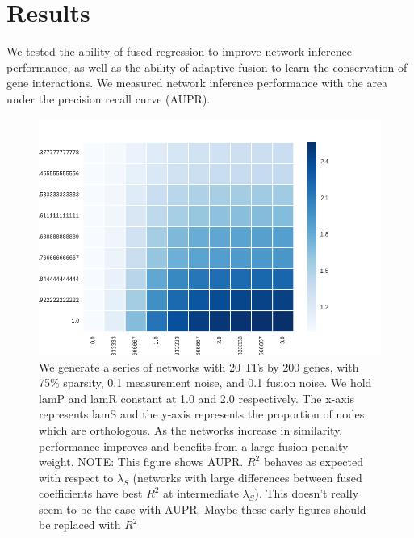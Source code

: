 \documentclass[11pt]{article}
\begin{document}
\section{Results}
We tested the ability of fused regression to improve network inference performance, as well as the ability of adaptive-fusion to learn the conservation of gene interactions. We measured network inference performance with the area under the precision recall curve (AUPR). 

\begin{figure}
\begin{center}
  \includegraphics[scale=0.45]{l2fusionquick.png}
  \caption{\label{fig:figure1} We generate a series of networks with 20 TFs by 200 genes, with 75\% sparsity, 0.1 measurement noise, and 0.1 fusion noise. We hold lamP and lamR constant at 1.0 and 2.0 respectively. The x-axis represents lamS and the y-axis represents the proportion of nodes which are orthologous. As the networks increase in similarity, performance improves and benefits from a large fusion penalty weight. NOTE: This figure shows AUPR. $R^2$ behaves as expected with respect to $\lambda_S$ (networks with large differences between fused coefficients have best $R^2$ at intermediate $\lambda_S$). This doesn't really seem to be the case with AUPR. Maybe these early figures should be replaced with $R^2$}
  \end{center}
\end{figure}
\end{document}
